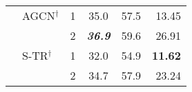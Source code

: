 \documentclass[journal]{IEEEtran}
\newcommand\paretocolor{lgreen!20}
\theoremstyle{definition}
\begin{document}
\begin{table}[!tbp]
\begin{center}
{\begin{tabular}{llcccr}
    & AGCN$^\dagger$                                            & 1     & \colorbox{\paretocolor}{35.0}      & \colorbox{\paretocolor}{57.5}  & \colorbox{\paretocolor}{13.45} \\
    &                                                           & 2     & \colorbox{\paretocolor}{\textbf{\textit{36.9}}}      & \colorbox{\paretocolor}{59.6}  & \colorbox{\paretocolor}{26.91} \\
    & S-TR$^\dagger$                                            & 1     
                                                                        & \colorbox{\paretocolor}{32.0}      & \colorbox{\paretocolor}{54.9}  &  \colorbox{\paretocolor}{\textbf{11.62}} \\
    &                                                           & 2     & \colorbox{\paretocolor}{34.7}      & \colorbox{\paretocolor}{57.9}  & \colorbox{\paretocolor}{23.24} \\
  

\end{tabular}}
\end{center}
\end{table}
\end{document}
